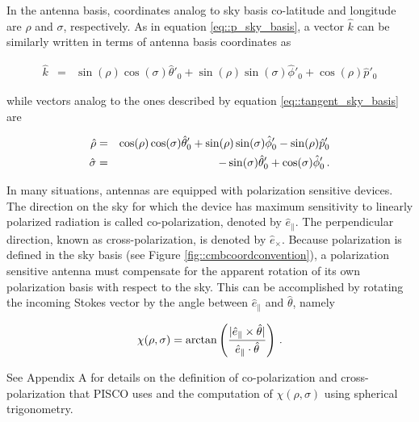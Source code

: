 \documentclass[a4paper,11pt]{article}
\newcommand{\co}{\mathbin{\|}}
\newcommand{\cx}{\mathbin{\times}}
\begin{document}
In the antenna basis, coordinates analog to sky basis co-latitude and longitude are $\rho$ and $\sigma$, respectively. As in equation \ref{eq::p_sky_basis}, a vector $\hat{k}$ can be similarly written in terms of antenna basis coordinates as

\begin{equation}
\begin{aligned}
\hat{k}       &=&  \sin(\rho)\cos(\sigma)\hat{\theta}'_0 + \sin(\rho)\sin(\sigma) \hat{\phi}'_0 + \cos(\rho) \hat{p}'_0 
\end{aligned}
\end{equation}

\noindent
while vectors analog to the ones described by equation \ref{eq::tangent_sky_basis} are

\begin{eqnarray}
\begin{aligned}
\hat{\rho}    &=&  \cos(\rho)\cos(\sigma)\hat{\theta}'_0 + \sin(\rho)\sin(\sigma) \hat{\phi}'_0 - \sin(\rho) \hat{p}'_0 \\
\hat{\sigma}  &=& -\sin(\sigma)\hat{\theta}'_0 + \cos(\sigma)\hat{\phi}'_0 \, \rm{.}
\end{aligned}
\end{eqnarray}

In many situations, antennas are equipped with polarization sensitive devices. The direction on the sky for which the device has maximum sensitivity to linearly polarized radiation is called co-polarization, denoted by $\hat{e}_{\co}$. The perpendicular direction, known as cross-polarization, is denoted by $\hat{e}_{\cx}$.
Because polarization is defined in the sky basis (see Figure \ref{fig::cmbcoordconvention}), a polarization sensitive antenna must compensate for the apparent rotation of its own polarization basis with respect to the sky. This can be accomplished by rotating the incoming Stokes vector by the angle between $\hat{e}_{\co}$ and $\hat{\theta}$, namely

\begin{equation}
\chi(\rho,\sigma) = \arctan \left( \frac{ |\hat{e}_{\co} \times \hat{\theta}| }{ \hat{e}_{\co} \cdot \hat{\theta} } \right) \, \rm{.}
\label{eq::psi}
\end{equation}

See Appendix A for details on the definition of co-polarization and cross-polarization that PISCO uses and the computation of $\chi(\rho,\sigma)$ using spherical trigonometry.
\end{document}
